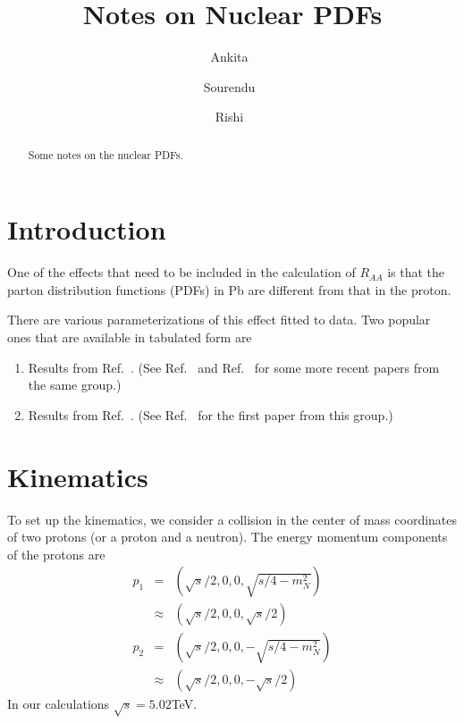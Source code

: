 \documentclass[aps,prd,%
 ]{revtex4}
\begin{document}
\title{Notes on Nuclear PDFs}
\author{Ankita\ }
\author{Sourendu\ }
\author{Rishi\ }

\begin{abstract}
Some notes on the nuclear PDFs.
\end{abstract}
\maketitle

\section{Introduction}
One of the effects that need to be included in the calculation of $R_{AA}$ is
that the parton distribution functions (PDFs) in Pb are different from that in
the proton.

There are various parameterizations of this effect fitted to data. Two popular 
ones that are available in tabulated form are
\begin{enumerate}
\item{Results from Ref.~\cite{Eskola:2009uj}. (See Ref.~\cite{Paukkunen:2014pha}
and Ref.~\cite{Eskola:2020yfa} for some more recent papers from the same
group.)}
\item{Results from Ref.~\cite{Kovarik:2015cma}. (See
Ref.~\cite{Schienbein:2009kk} for the first paper from this group.)}
\end{enumerate}

\section{Kinematics}
To set up the kinematics, we consider a collision in the center of mass
coordinates of two protons (or a proton and a neutron). The energy momentum
components of the protons are
\begin{eqnarray}
p_1 &=& (\sqrt{s}/2,0,0,\sqrt{s/4-m_N^2}) \\
&\approx&  (\sqrt{s}/2,0,0,\sqrt{s}/2)\\
p_2 &=& (\sqrt{s}/2,0,0,-\sqrt{s/4-m_N^2}) \\
&\approx&  (\sqrt{s}/2,0,0,-\sqrt{s}/2)
\end{eqnarray}
In our calculations $\sqrt{s}=5.02$TeV. 
\end{document}
